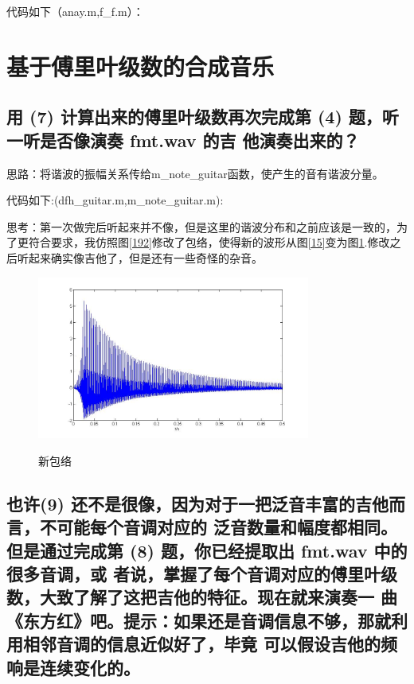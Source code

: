 \documentclass{ctexart}
\begin{document}
        代码如下（anay.m,f\_f.m）：
        
        
        \section{
            基于傅里叶级数的合成音乐
        }
        \setcounter{subsection}{9} 
        \subsection{
            用 (7) 计算出来的傅里叶级数再次完成第 (4) 题，听一听是否像演奏 fmt.wav 的吉
            他演奏出来的？
        }
        思路：将谐波的振幅关系传给m\_note\_guitar函数，使产生的音有谐波分量。

        代码如下:(dfh\_guitar.m,m\_note\_guitar.m):

        
        

        思考：第一次做完后听起来并不像，但是这里的谐波分布和之前应该是一致的，为了更符合要求，我仿照图\ref{192}修改了包络，使得新的波形从图\ref{15}变为图\ref{110}.修改之后听起来确实像吉他了，但是还有一些奇怪的杂音。
        \begin{figure}
            \centering
            \includegraphics[width=0.8\textwidth]{fmt/1_10.jpg}\\
            \caption{新包络\label{110}}
        \end{figure}

        \subsection{
            也许(9) 还不是很像，因为对于一把泛音丰富的吉他而言，不可能每个音调对应的
            泛音数量和幅度都相同。但是通过完成第 (8) 题，你已经提取出 fmt.wav 中的很多音调，或
            者说，掌握了每个音调对应的傅里叶级数，大致了解了这把吉他的特征。现在就来演奏一
            曲《东方红》吧。提示：如果还是音调信息不够，那就利用相邻音调的信息近似好了，毕竟
            可以假设吉他的频响是连续变化的。
        }        
\end{document}

